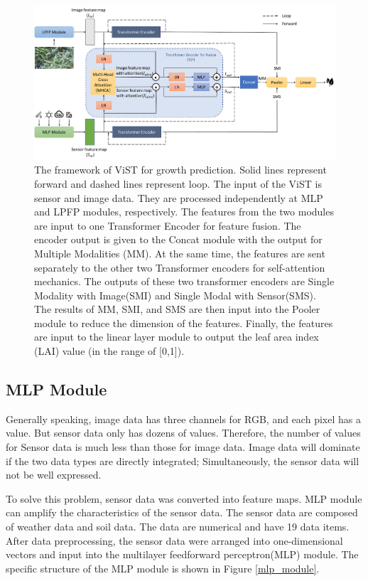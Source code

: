 \documentclass[acmsmall,manuscript, screen, review]{acmart}
\begin{document}
\begin{figure}[htbp]
  \centering
  \includegraphics[width=\linewidth]{pic/model_structure.png}
  \caption{The framework of ViST for growth prediction. Solid lines represent forward and dashed lines represent loop. The input of the ViST is sensor and image data. They are processed independently at MLP and LPFP modules, respectively. The features from the two modules are input to one Transformer Encoder for feature fusion. The encoder output is given to the Concat module with the output for Multiple Modalities (MM). At the same time, the features are sent separately to the other two Transformer encoders for self-attention mechanics. The outputs of these two transformer encoders are Single Modality with Image(SMI) and Single Modal with Sensor(SMS). The results of MM, SMI, and SMS are then input into the Pooler module to reduce the dimension of the features. Finally, the features are input to the linear layer module to output the leaf area index (LAI) value (in the range of [0,1]).}
  \label{model_structure}
\end{figure}



\subsection{MLP Module}
Generally speaking, image data has three channels for RGB, and each pixel has a value. But sensor data only has dozens of values. Therefore, the number of values for Sensor data is much less than those for image data. Image data will dominate if the two data types are directly integrated; Simultaneously, the sensor data will not be well expressed.

To solve this problem, sensor data was converted into feature maps. MLP module can amplify the characteristics of the sensor data. The sensor data are composed of weather data and soil data. The data are numerical and have 19 data items. After data preprocessing, the sensor data were arranged into one-dimensional vectors and input into the multilayer feedforward perceptron(MLP) module. The specific structure of the MLP module is shown in Figure \ref{mlp_module}.
\end{document}
